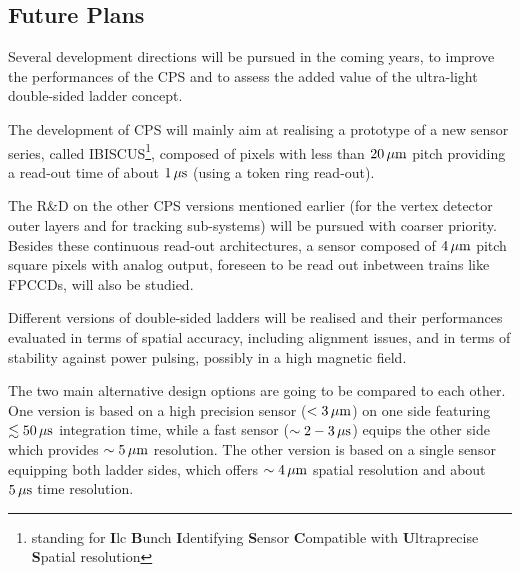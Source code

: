 \subsection{Future Plans}

Several development directions will be pursued in the coming years,
to improve the performances of the CPS and to assess the added value
of the ultra-light double-sided ladder concept.

The development of CPS will mainly aim at realising a prototype of
a new sensor series, called IBISCUS\footnote{standing for {\bf I}lc
{\bf B}unch {\bf I}dentifying {\bf S}ensor {\bf C}ompatible with
{\bf U}ltraprecise {\bf S}patial resolution},
composed of pixels with less than $\unit[20]{\mu m}$ pitch providing a
read-out time of about $\unit[1]{\mu s}$ (using a token ring read-out).

The R\&D on the other CPS versions mentioned earlier (for the vertex
detector outer layers and for tracking sub-systems) will be pursued
with coarser priority.
Besides these continuous read-out architectures, a sensor composed
of $\unit[4]{\mu m}$ pitch square pixels with analog output, foreseen to be
read out inbetween trains like FPCCDs, will also be studied.


Different versions of double-sided ladders will be realised and
their performances evaluated in terms of spatial accuracy, including
alignment issues, and in terms of stability against power pulsing,
possibly in a high magnetic field.

The two main alternative design options are going to be compared
to each other. One version is based on a high precision sensor
($<\unit[3]{\mu m}$) on one side featuring $\lesssim\unit[50]{\mu s}$ integration
time, while a fast sensor ($\sim\unit[2-3]{\mu s}$) equips the other side
which provides $\sim\unit[5]{\mu m}$ resolution. The other version is based
on a single sensor equipping both ladder sides, which offers $\sim\unit[4]{\mu m}$
spatial resolution and about $\unit[5]{\mu s}$ time resolution.
